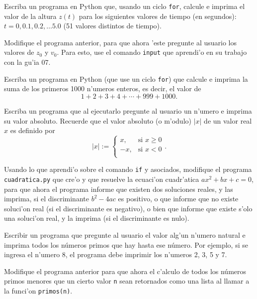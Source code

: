 \documentclass[11pt]{exam}
\begin{document}
\begin{questions}
Escriba un programa en Python que, usando un ciclo \texttt{for}, calcule e imprima el valor de la altura $z(t)$ para los siguientes valores de tiempo (en segundos): $t=0, 0.1, 0.2, \dots 5.0$ (51 valores distintos de tiempo).

\item Modifique el programa anterior, para que ahora 'este pregunte al usuario los valores de $z_0$ y $v_0$. Para esto, use el comando \texttt{input} que aprendi'o en su trabajo con la gu'ia 07.

\item Escriba un programa en Python (que use un ciclo \texttt{for}) que calcule e imprima la suma de los primeros 1000 n'umeros enteros, es decir, el valor de 
\begin{equation}
1 + 2 + 3 + 4  + \cdots + 999 + 1000.
\end{equation}

\item Escriba un programa que al ejecutarlo pregunte al usuario un n'umero e imprima su valor absoluto. Recuerde que el valor absoluto (o m'odulo) $|x|$ de un valor real $x$ es definido por
\begin{equation}
|x|:=\left\{\begin{array}{cl}
x, &\text{si } x\ge 0 \\
-x, & \text{si } x<0 \\
\end{array}\right. .
\end{equation}

\item Usando lo que aprendi'o sobre el comando \texttt{if} y asociados, modifique el programa \texttt{cuadratica.py} que cre'o y que resuelve la ecuaci'on cuadr'atica $ax^2+bx+c=0$, para que ahora el programa informe que existen dos soluciones reales, y las imprima, si el discriminante $b^2-4ac$ es positivo, o que informe que no existe soluci'on real (si el discriminante es negativo), o bien que informe que existe s'olo una soluci'on real, y la imprima (si el discriminante es nulo).

\item Escribir un programa que pregunte al usuario el valor alg'un n'umero natural e imprima todos los números primos que hay hasta ese número. Por ejemplo, si se ingresa el n'umero 8, el programa debe imprimir los n'umeros 2, 3, 5 y 7.

\item Modifique el programa anterior para que ahora el c'alculo de todos los números primos menores que un cierto valor \texttt{n} sean retornados como una lista al llamar a la funci'on \texttt{primos(n)}.


\end{questions}
\end{document}

